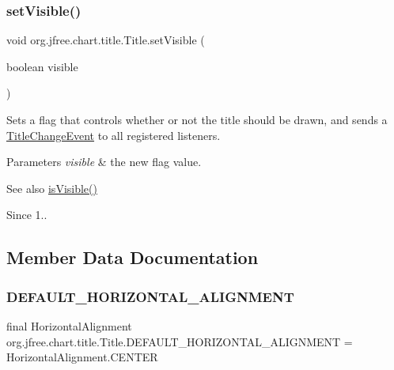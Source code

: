 \subsubsection{\texorpdfstring{set\+Visible()}{setVisible()}}
{\footnotesize\ttfamily void org.\+jfree.\+chart.\+title.\+Title.\+set\+Visible (\begin{DoxyParamCaption}\item[{boolean}]{visible }\end{DoxyParamCaption})}

Sets a flag that controls whether or not the title should be drawn, and sends a \mbox{\hyperlink{}{Title\+Change\+Event}} to all registered listeners.


\begin{DoxyParams}{Parameters}
{\em visible} & the new flag value.\\
\hline
\end{DoxyParams}
\begin{DoxySeeAlso}{See also}
\mbox{\hyperlink{classorg_1_1jfree_1_1chart_1_1title_1_1_title_aab346ae505ab18ec0580d93d3b59fcea}{is\+Visible()}}
\end{DoxySeeAlso}
\begin{DoxySince}{Since}
1.. 
\end{DoxySince}


\subsection{Member Data Documentation}
\mbox{\label{classorg_1_1jfree_1_1chart_1_1title_1_1_title_ad414d444467ecf79bffc22e6aab8b022}} 
\subsubsection{\texorpdfstring{D\+E\+F\+A\+U\+L\+T\+\_\+\+H\+O\+R\+I\+Z\+O\+N\+T\+A\+L\+\_\+\+A\+L\+I\+G\+N\+M\+E\+NT}{DEFAULT\_HORIZONTAL\_ALIGNMENT}}
{\footnotesize\ttfamily final Horizontal\+Alignment org.\+jfree.\+chart.\+title.\+Title.\+D\+E\+F\+A\+U\+L\+T\+\_\+\+H\+O\+R\+I\+Z\+O\+N\+T\+A\+L\+\_\+\+A\+L\+I\+G\+N\+M\+E\+NT = Horizontal\+Alignment.\+C\+E\+N\+T\+ER\hspace{0.3cm}{\ttfamily [static]}}

